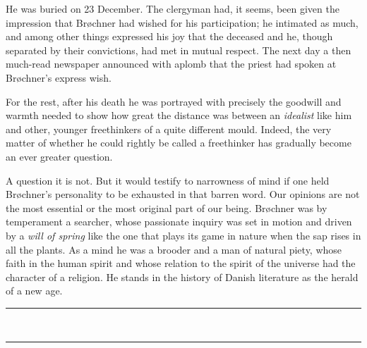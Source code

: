 \documentclass[12pt,a4paper,openany]{book}
\newcommand{\opage}[1]{\marginnote{\footnotesize\textit{[#1]}}}
\newcommand{\closingrule}{\begin{center}\rule{3cm}{0.4pt}\\[-0.8\baselineskip]\rule{3cm}{0.4pt}\end{center}}
\begin{document}
He was buried on 23 December. The clergyman had, it seems, been given the
impression that Brøchner had wished for his participation; he intimated as
much, and among other things expressed his joy that the deceased and he,
though separated by their convictions, had met in mutual respect. The next day
a then much-read newspaper announced with aplomb that the priest had spoken at
Brøchner's express wish.

For the rest, after his death he was portrayed with precisely the goodwill and
warmth needed to show how great the distance was between an \emph{idealist}
like him and other, younger freethinkers of a quite different mould. Indeed,
the very matter of whether he could rightly be called a freethinker has
gradually become an ever greater question.

A question it is not. But it would testify to narrowness of
\opage{255}mind if one held Brøchner's personality to be exhausted in that barren word.
Our opinions are not the most essential or the most original part of our being.
Brøchner was by temperament a searcher, whose passionate inquiry was set in
motion and driven by a \emph{will of spring} like the one that plays its game
in nature when the sap rises in all the plants. As a mind he was a brooder and
a man of natural piety, whose faith in the human spirit and whose relation to
the spirit of the universe had the character of a religion. He stands in the
history of Danish literature as the herald of a new age.

\closingrule
\end{document}

